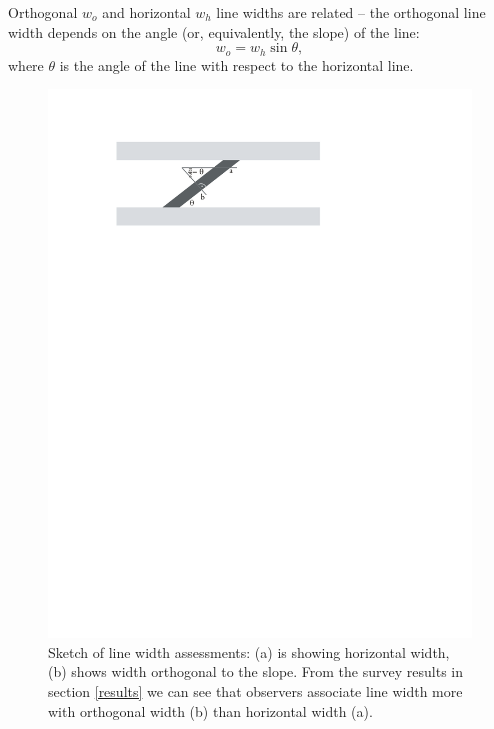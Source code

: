 Orthogonal $w_o$ and horizontal $w_h$ line widths are related -- the orthogonal line width depends on the angle (or, equivalently, the slope) of the line:
\begin{equation}\label{adjust}
w_o = w_h \sin \theta,
\end{equation}
where $\theta$ is the angle of the line with respect to the horizontal line.

\begin{figure}[htbp]
\begin{center}
\includegraphics[width=0.6\linewidth]{images/linewidth}
\end{center}
\caption{\label{fig:linewidth}Sketch of line width assessments: (a) is showing  horizontal width, (b) shows  width orthogonal to the slope. From the survey results in section \ref{results} we can see that  observers associate line width more with  orthogonal width (b) than horizontal width (a).}
\end{figure}






